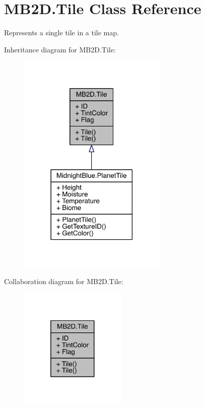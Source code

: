 \hypertarget{class_m_b2_d_1_1_tile}{}\section{M\+B2\+D.\+Tile Class Reference}
\label{class_m_b2_d_1_1_tile}


Represents a single tile in a tile map.  




Inheritance diagram for M\+B2\+D.\+Tile\+:
\nopagebreak
\begin{figure}[H]
\begin{center}
\leavevmode
\includegraphics[width=201pt]{class_m_b2_d_1_1_tile__inherit__graph}
\end{center}
\end{figure}


Collaboration diagram for M\+B2\+D.\+Tile\+:
\nopagebreak
\begin{figure}[H]
\begin{center}
\leavevmode
\includegraphics[width=145pt]{class_m_b2_d_1_1_tile__coll__graph}
\end{center}
\end{figure}
